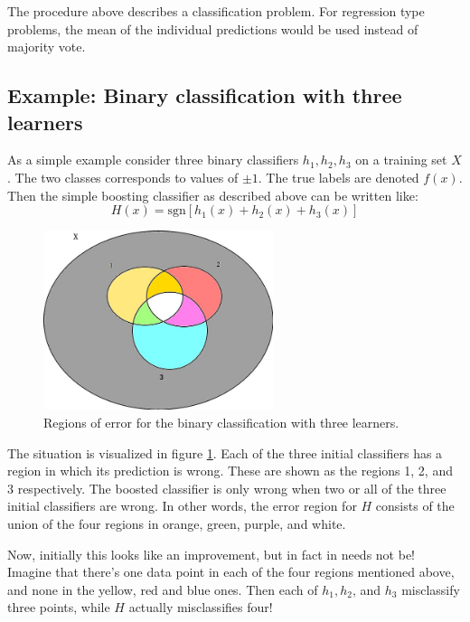 \documentclass[12pt, a4paper]{article}
\numberwithin{equation}{section}
\begin{document}
The procedure above describes a classification problem. For regression type problems, the mean of the individual predictions would be used instead of majority vote.

\subsection{Example: Binary classification with three learners}
As a simple example consider three binary classifiers $h_1, h_2, h_3$ on a training set $X$. The two classes corresponds to values of $\pm 1$. The true labels are denoted $f(x)$. Then the simple boosting classifier as described above can be written like:
\begin{equation}
H(x)=\textrm{sgn}\left[h_1(x)+h_2(x)+h_3(x)\right]
\label{simple_three_boost}
\end{equation} 

\begin{figure}
\centering
\includegraphics[width=0.6\textwidth]{three_unweighted}
\caption{Regions of error for the binary classification with three learners.}
\label{fig:three_unweighted}
\end{figure}

The situation is visualized in figure \ref{fig:three_unweighted}. Each of the three initial classifiers has a region in which its prediction is wrong. These are shown as the regions 1, 2, and 3 respectively. The boosted classifier is only wrong when two or all of the three initial classifiers are wrong. In other words, the error region for $H$ consists of the union of the four regions in orange, green, purple, and white.

Now, initially this looks like an improvement, but in fact in needs not be! Imagine that there's one data point in each of the four regions mentioned above, and none in the yellow, red and blue ones. Then each of $h_1, h_2$, and $h_3$ misclassify three points, while $H$ actually misclassifies four!
\end{document}
